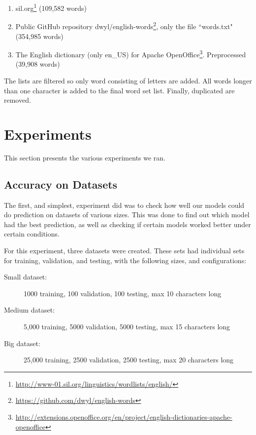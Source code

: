 \begin{enumerate}
    \item sil.org\footnote{\url{http://www-01.sil.org/linguistics/wordlists/english/}} (109,582 words)
    \item Public GitHub repository dwyl/english-words\footnote{\url{https://github.com/dwyl/english-words}}, only the file ``words.txt" (354,985 words) 
    \item The English dictionary (only en\_US) for Apache OpenOffice\footnote{\url{http://extensions.openoffice.org/en/project/english-dictionaries-apache-openoffice}}. Preprocessed (39,908 words)
\end{enumerate}

The lists are filtered so only word consisting of letters are added. All words longer than one character is added to the final word set list. Finally, duplicated are removed.


\section{Experiments}
This section presents the various experiments we ran.

\subsection{Accuracy on Datasets}
The first, and simplest, experiment did was to check how well our models could do prediction on datasets of various sizes. This was done to find out which model had the best prediction, as well as checking if certain models worked better under certain conditions.

For this experiment, three datasets were created. These sets had individual sets for training, validation, and testing, with the following sizes, and configurations:

\vspace{0.5cm}\noindent
\begin{minipage}{\linewidth}
    \begin{description}
        \item[Small dataset:]{1000 training, 100 validation, 100 testing, max 10 characters long}
        \item[Medium dataset:]{5,000 training, 5000 validation, 5000 testing, max 15 characters long}
        \item[Big dataset:]{25,000 training, 2500 validation, 2500 testing, max 20 characters long}
    \end{description}
\end{minipage}


